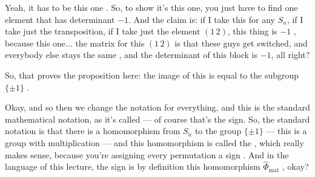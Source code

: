 \begin{speech}[00:22:19 - 00:23:44]
Yeah, it has to be this one . So, to show it's this one, you just have to find one element that has determinant $-1$. And the claim is: if I take this for any $S_n$, if I take just the transposition, if I take just the element $(1\,2)$, this thing is $-1$ , because this one... the matrix for this $(1\,2)$ is that these guys get switched, and everybody else stays the same , and the determinant of this block is $-1$, all right?

So, that proves the proposition here: the image of this is equal to the subgroup $\{\pm 1\}$ .

Okay, and so then we change the notation for everything, and this is the standard mathematical notation, as it's called --- of course that's the sign. So, the standard notation is that there is a homomorphism from $S_n$ to the group $\{\pm 1\}$ --- this is a group with multiplication --- and this homomorphism is called the , which really makes sense, because you're assigning every permutation a sign . And in the language of this lecture, the sign is by definition this homomorphism $\hat{\Phi}_{\text{mat}}$ , okay?
\end{speech}

